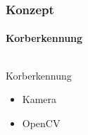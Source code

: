 \begin{frame}
    \frametitle{Konzept}
    \framesubtitle{Korberkennung}
    \begin{columns}
        \begin{column}{0.4\textwidth}
            \begin{block}{Korberkennung}
                \begin{itemize}
                    \item Kamera
                    \item OpenCV
                \end{itemize}
            \end{block}
        \end{column}
        \begin{column}{0.6\textwidth}
        \end{column}
    \end{columns}
\end{frame}

